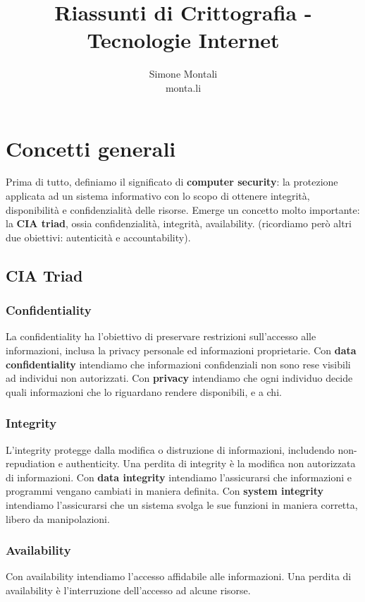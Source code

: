 \documentclass[11pt]{article}
\begin{document}
\author{Simone Montali\\monta.li}
\title{Riassunti di Crittografia - Tecnologie Internet}

\maketitle

\medskip
\section{Concetti generali}
Prima di tutto, definiamo il significato di \textbf{computer security}: la protezione applicata ad un sistema informativo con lo scopo di ottenere integrità, disponibilità e confidenzialità delle risorse. Emerge un concetto molto importante: la \textbf{CIA triad}, ossia confidenzialità, integrità, availability. (ricordiamo però altri due obiettivi: autenticità e accountability).
\subsection{CIA Triad}
\subsubsection{Confidentiality}
La confidentiality ha l'obiettivo di preservare restrizioni sull'accesso alle informazioni, inclusa la privacy personale ed informazioni proprietarie. Con \textbf{data confidentiality} intendiamo che informazioni confidenziali non sono rese visibili ad individui non autorizzati. Con \textbf{privacy} intendiamo che ogni individuo decide quali informazioni che lo riguardano rendere disponibili, e a chi. 
\subsubsection{Integrity}
L'integrity protegge dalla modifica o distruzione di informazioni, includendo non-repudiation e authenticity. Una perdita di integrity è la modifica non autorizzata di informazioni. Con \textbf{data integrity} intendiamo l'assicurarsi che informazioni e programmi vengano cambiati in maniera definita. Con \textbf{system integrity} intendiamo l'assicurarsi che un sistema svolga le sue funzioni in maniera corretta, libero da manipolazioni. 
\subsubsection{Availability}
Con availability intendiamo l'accesso affidabile alle informazioni. Una perdita di availability è l'interruzione dell'accesso ad alcune risorse.
\end{document}
